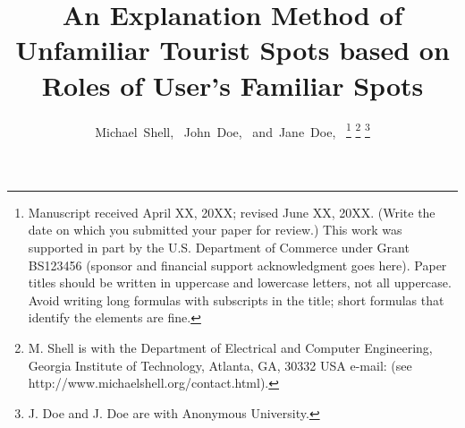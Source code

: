 \documentclass[journal]{IAENGtran}
\begin{document}
%
\title{An Explanation Method of Unfamiliar Tourist Spots based on Roles of User's Familiar Spots}
%
%
%

\author{Michael~Shell,~
        John~Doe,~
        and~Jane~Doe,~%
\thanks{Manuscript received April XX, 20XX; revised June XX, 20XX. (Write the date on
which you submitted your paper for review.) This work was supported
in part by the U.S. Department of Commerce under Grant BS123456
(sponsor and financial support acknowledgment goes here). Paper
titles should be written in uppercase and lowercase letters, not all
uppercase. Avoid writing long formulas with subscripts in the title;
short formulas that identify the elements are fine.}
\thanks{M. Shell is with the Department
of Electrical and Computer Engineering, Georgia Institute of
Technology, Atlanta,
GA, 30332 USA e-mail: (see http://www.michaelshell.org/contact.html).}%
\thanks{J. Doe and J. Doe are with Anonymous University.}}%


\maketitle

\pagestyle{empty}
\thispagestyle{empty}
\end{document}
